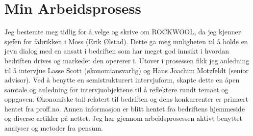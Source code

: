 \section{Min Arbeidsprosess}
Jeg bestemte meg tidlig for å velge og skrive om ROCKWOOL, da jeg kjenner sjefen for fabrikken i Moss (Erik Ølstad). Dette ga meg muligheten til å holde en jevn dialog med en ansatt i bedriften som har meget god innsikt i hvordan bedriften drives og markedet den opererer i. Utover i prosessen fikk jeg anledning til å intervjue Lasse Scott (økonomiansvarlig) og Hans Joachim Motzfeldt (senior advisor). Ved å benytte en semistrukturert intervjuform, skapte dette en åpen samtale og anledning for intervjuobjektene til å reflektere rundt temaet og oppgaven. Økonomiske tall relatert til bedriften og dens konkurrenter er primært hentet fra proff.no. Annen informasjon er blitt hentet fra bedriftens hjemmeside og diverse artikler på nettet. Jeg har gjennom arbeidsprosessen aktivt benyttet analyser og metoder fra pensum.

